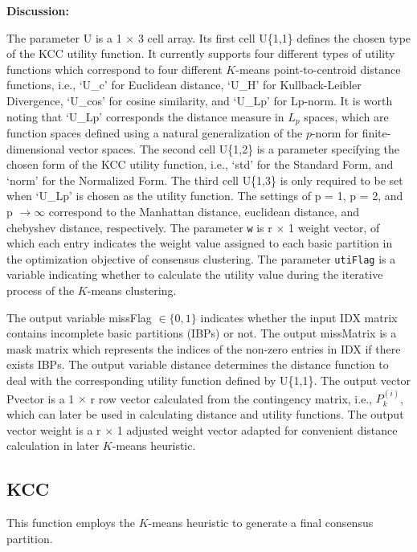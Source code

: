 \documentclass[10pt]{acmtrans2e}
\newenvironment{remark}
{\vspace*{0.1cm}
\noindent \textbf{Discussion:} \medskip

}
{
\vspace*{0.2cm}
}
\begin{document}
\begin{remark}
\noindent The parameter \textsf{U} is a \textsf{1} $\times$ \textsf{3} cell array. Its first cell \textsf{U\{1,1\}} defines the chosen type of the KCC utility function. It currently supports four different types of utility functions which correspond to four different $K$-means point-to-centroid distance functions, i.e., \textsf{`U\_c'} for Euclidean distance, \textsf{`U\_H'} for Kullback-Leibler Divergence, \textsf{`U\_cos'} for cosine similarity, and \textsf{`U\_Lp'} for Lp-norm. It is worth noting that \textsf{`U\_Lp'} corresponds the distance measure in $L_p$ spaces, which are function spaces defined using a natural generalization of the $p$-norm for finite-dimensional vector spaces. The second cell \textsf{U\{1,2\}} is a parameter specifying the chosen form of the KCC utility function, i.e., \textsf{`std'} for the Standard Form, and \textsf{`norm'} for the Normalized Form. The third cell \textsf{U\{1,3\}} is only required to be set when \textsf{`U\_Lp'} is chosen as the utility function. The settings of \textsf{p = 1}, \textsf{p = 2}, and \textsf{p} $\rightarrow \infty$ correspond to the Manhattan distance, euclidean distance, and chebyshev distance, respectively.  The parameter \texttt{w} is \textsf{r} $\times$ \textsf{1} weight vector, of which each entry indicates the weight value assigned to each basic partition in the optimization objective of consensus clustering. The parameter \texttt{utiFlag} is a variable indicating whether to calculate the utility value during the iterative process of the $K$-means clustering.

The output variable \textsf{missFlag} $\in \{0, 1\}$ indicates whether the input \textsf{IDX} matrix contains incomplete basic partitions (IBPs) or not. The output \textsf{missMatrix} is a mask matrix which represents the indices of the non-zero entries in \textsf{IDX} if there exists IBPs. The output variable \textsf{distance} determines the distance function to deal with the corresponding utility function defined by \textsf{U\{1,1\}}. The output vector \textsf{Pvector} is a \textsf{1} $\times$ \textsf{r} row vector calculated from the contingency matrix, i.e., $P^{(i)}_k$, which can later be used in calculating distance and utility functions. The output vector \textsf{weight} is a \textsf{r} $\times$ \textsf{1} adjusted weight vector adapted for convenient distance calculation in later $K$-means heuristic. 
\end{remark}

\subsection{KCC}
This function employs the $K$-means heuristic to generate a final consensus partition.
\end{document}
